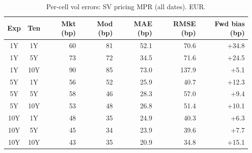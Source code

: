 \begin{table}[H]
\centering
\caption{Per-cell vol errors: SV pricing MPR (all dates). EUR.}
\label{tab:sv_pricing_per_cell_all}
\small
\begin{tabular}{@{}ccrrrrr@{}}
\toprule
\textbf{Exp} & \textbf{Ten} & \textbf{Mkt (bp)} & \textbf{Mod (bp)} & \textbf{MAE (bp)} & \textbf{RMSE (bp)} & \textbf{Fwd bias (bp)} \\
\midrule
  1Y & 1Y & 60 & 81 & 52.1 & 70.6 & +34.8 \\
  1Y & 5Y & 73 & 72 & 34.5 & 71.6 & +24.5 \\
  1Y & 10Y & 90 & 85 & 73.0 & 137.9 & +5.1 \\
  \midrule
  5Y & 1Y & 56 & 52 & 25.9 & 40.7 & +12.3 \\
  5Y & 5Y & 58 & 46 & 28.3 & 57.0 & +9.4 \\
  5Y & 10Y & 53 & 48 & 26.8 & 51.4 & +10.1 \\
  \midrule
  10Y & 1Y & 48 & 35 & 24.9 & 40.3 & +6.3 \\
  10Y & 5Y & 45 & 34 & 23.9 & 39.6 & +7.7 \\
  10Y & 10Y & 43 & 35 & 20.9 & 34.8 & +15.1 \\
\bottomrule
\end{tabular}
\end{table}